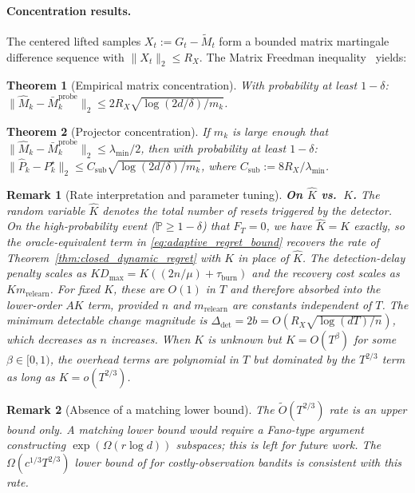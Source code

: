 \documentclass{article}
\newcommand{\Prob}{\mathbb{P}}
\newtheorem{theorem}{Theorem}
\newtheorem{remark}{Remark}
\begin{document}
\paragraph{Concentration results.}
The centered lifted samples $X_t := G_t - \widetilde{M}_t$ form a bounded matrix martingale difference sequence with $\|X_t\|_2 \le R_X$.
The Matrix Freedman inequality~\citep{tropp2012user} yields:

\begin{theorem}[Empirical matrix concentration]
\label{thm:matrix_concentration_summary}
With probability at least $1-\delta$:
$\|\widehat{M}_k - \bar{M}_k^{\mathrm{probe}}\|_2 \le 2R_X \sqrt{\log(2d/\delta)/m_k}$.
\end{theorem}

\begin{theorem}[Projector concentration]
\label{thm:projector_concentration_summary}
If $m_k$ is large enough that $\|\widehat M_k - \bar M_k^{\mathrm{probe}}\|_2 \le \lambda_{\min}/2$, then with probability at least $1-\delta$:
$\|\widehat{P}_k - P_k^\star\|_2 \le C_{\mathrm{sub}}\sqrt{\log(2d/\delta)/m_k}$, where $C_{\mathrm{sub}} := 8R_X/\lambda_{\min}$.
\end{theorem}

\begin{remark}[Rate interpretation and parameter tuning]
\label{rem:adaptive_rate_discussion}
\textbf{On $\hat K$ vs.\ $K$.}  The random variable $\hat K$ denotes the total number of resets triggered by the detector.  On the high-probability event ($\Prob \ge 1-\delta$) that $F_T = 0$, we have $\hat K = K$ exactly, so the oracle-equivalent term in \eqref{eq:adaptive_regret_bound} recovers the rate of Theorem~\ref{thm:closed_dynamic_regret} with $K$ in place of $\hat K$.  The detection-delay penalty scales as $K D_{\max} = K((2n/\mu) + \tau_{\mathrm{burn}})$ and the recovery cost scales as $K m_{\mathrm{relearn}}$.  For fixed $K$, these are $O(1)$ in $T$ and therefore absorbed into the lower-order $AK$ term, provided $n$ and $m_{\mathrm{relearn}}$ are constants independent of $T$.  The minimum detectable change magnitude is $\Delta_{\mathrm{det}} = 2b = O(R_X\sqrt{\log(dT)/n})$, which decreases as $n$ increases.  When $K$ is unknown but $K = O(T^\beta)$ for some $\beta \in [0, 1)$, the overhead terms are polynomial in $T$ but dominated by the $T^{2/3}$ term as long as $K = o(T^{2/3})$.
\end{remark}

\begin{remark}[Absence of a matching lower bound]
\label{rem:lower_bound}
The $\widetilde O(T^{2/3})$ rate is an upper bound only.
A matching lower bound would require a Fano-type argument constructing $\exp(\Omega(r\log d))$ subspaces; this is left for future work.
The $\Omega(c^{1/3}T^{2/3})$ lower bound of \citet{tucker2023costly} for costly-observation bandits is consistent with this rate.
\end{remark}
\end{document}
